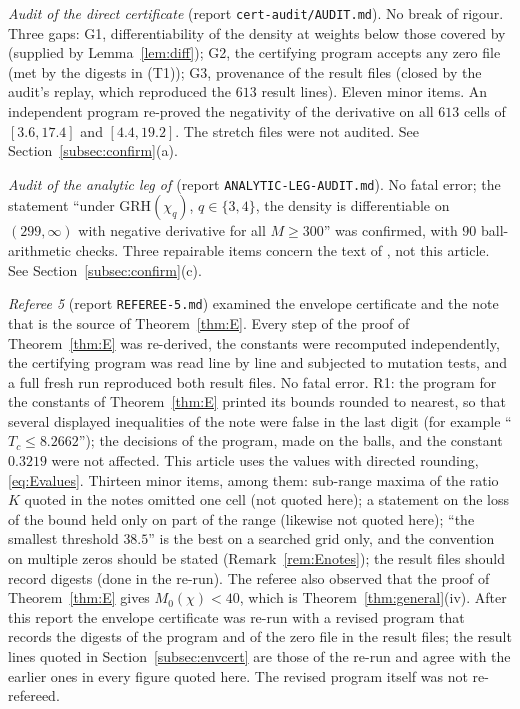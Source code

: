 \documentclass[11pt]{amsart}
\theoremstyle{definition}
\numberwithin{equation}{section}
\begin{document}
\emph{Audit of the direct certificate} (report
\texttt{cert-audit/AUDIT.md}). No break of rigour. Three gaps:
G1, differentiability of the density at weights below those covered
by \cite[Lemma~21]{WR} (supplied by Lemma~\ref{lem:diff}); G2, the
certifying program accepts any zero file (met by the digests in (T1));
G3, provenance of the result files (closed by the audit's replay,
which reproduced the $613$ result lines). Eleven minor items. An
independent program re-proved the negativity of the derivative on all
$613$ cells of $[3.6,17.4]$ and $[4.4,19.2]$. The stretch files were
not audited. See Section~\ref{subsec:confirm}(a).

\emph{Audit of the analytic leg of \cite{WR}} (report
\texttt{ANALYTIC-LEG-AUDIT.md}). No fatal error; the statement
``under GRH$(\chi_q)$, $q\in\{3,4\}$, the density is differentiable
on $(299,\infty)$ with negative derivative for all $M\ge300$'' was
confirmed, with $90$ ball-arithmetic checks. Three repairable items
concern the text of \cite{WR}, not this article. See
Section~\ref{subsec:confirm}(c).

\emph{Referee 5} (report \texttt{REFEREE-5.md}) examined the envelope
certificate and the note that is the source of
Theorem~\ref{thm:E}. Every step of the proof of
Theorem~\ref{thm:E} was re-derived, the constants were recomputed
independently, the certifying program was read line by line and
subjected to mutation tests, and a full fresh run reproduced both
result files. No fatal error. R1: the program for the constants of
Theorem~\ref{thm:E} printed its bounds rounded to nearest, so that
several displayed inequalities of the note were false in the last
digit (for example ``$T_c\le8.2662$''); the decisions of the program,
made on the balls, and the constant $0.3219$ were not affected. This
article uses the values with directed rounding, \eqref{eq:Evalues}.
Thirteen minor items, among them: sub-range maxima of the ratio $K$
quoted in the notes omitted one cell (not quoted here); a statement
on the loss of the bound held only on part of the range (likewise not
quoted here); ``the smallest threshold $38.5$'' is the best
on a searched grid only, and the convention on multiple zeros should
be stated (Remark~\ref{rem:Enotes}); the result files should record
digests (done in the re-run). The referee also observed that
the proof of Theorem~\ref{thm:E} gives $M_0(\chi)<40$, which is
Theorem~\ref{thm:general}(iv). After this report the envelope
certificate was re-run with a revised program that records the
digests of the program and of the zero file in the result files; the
result lines quoted in Section~\ref{subsec:envcert} are those of the
re-run and agree with the earlier ones in every figure quoted here.
The revised program itself was not re-refereed.
\end{document}
